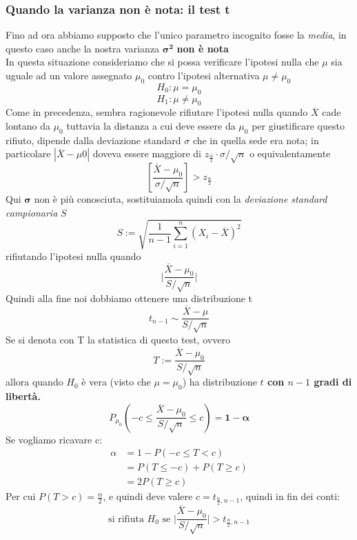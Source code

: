 \documentclass[]{article}
\begin{document}
    \subsubsection{Quando la varianza non è nota: il test t}
    Fino ad ora abbiamo supposto che l'unico parametro incognito fosse la \textit{media}, in questo caso anche la nostra varianza $\boldsymbol{\sigma^2}$ \textbf{non è nota} \\
    In questa situazione consideriamo che si possa verificare l'ipotesi nulla che $\mu$ sia uguale ad un valore assegnato $\mu_0$ contro l'ipotesi alternativa $\mu \not= \mu_0$
    \[ H_0 : \mu = \mu_0 \]
    \[ H_1 : \mu \not= \mu_0 \]
    Come in precedenza, sembra ragionevole rifiutare l’ipotesi nulla quando $\overline{X}$ cade
    lontano da $\mu_0$ tuttavia la distanza a cui deve essere da $\mu_0$ per giustificare questo
    rifiuto, dipende dalla deviazione standard $\sigma$ che in quella sede era nota; in particolare
    $|\overline{X} - \mu0|$ doveva essere maggiore di $z_{\frac{\alpha}{2}} \cdot \sigma / \sqrt{n}$ o equivalentamente
    \[ \left[ \frac{\overline{X} - \mu_0}{\sigma / \sqrt{n}} \right] > z_{\frac{\alpha}{2}} \]
    Qui $\boldsymbol{\sigma}$ non è più conosciuta, sostituiamola quindi con la \textit{deviazione standard campionaria} $S$
    \[ S := \sqrt{\frac{1}{n-1} \sum_{i=1}^{n} (X_i - \overline{X})^2} \]
    rifiutando l'ipotesi nulla quando 
    \[ \big\rvert \frac{\overline{X} - \mu_0}{S / \sqrt{n}} \big\rvert \] 
    Quindi alla fine noi dobbiamo ottenere una distribuzione t
    \[  t_{n-1} \sim \frac{\overline{X} - \mu}{S/ \sqrt{n}} \]
    Se si denota con T la statistica di questo test, ovvero 
    \[ T := \frac{\overline{X} - \mu_0}{S / \sqrt{n}} \]
    allora quando $H_0$ è vera (visto che $\mu = \mu_0$) ha distribuzione \textbf{$t$ con $n-1$ gradi di libertà.}
    \[ P_{\mu_0} \left( - c \leq \frac{\overline{X} - \mu_0}{S / \sqrt{n}} \leq c \right) = \boldsymbol{1- \alpha} \]
    Se vogliamo ricavare c:
    \begin{equation*}
        \begin{split}
            \alpha &= 1 - P(-c \leq T < c) \\
            &= P(T \leq -c) + P(T \geq c) \\
            &= 2P(T \geq c)
        \end{split}
    \end{equation*}
    Per cui $P(T > c) = \frac{\alpha}{2}$, e quindi deve valere $c = t_{\frac{\alpha}{2}, n-1}$, quindi in fin dei conti:
    \[ \text{si rifiuta } H_0 \text{ se } \big| \frac{\overline{X} - \mu_0}{S / \sqrt{n}} \big| > t_{\frac{\alpha}{2}, n-1} \]
\end{document}
